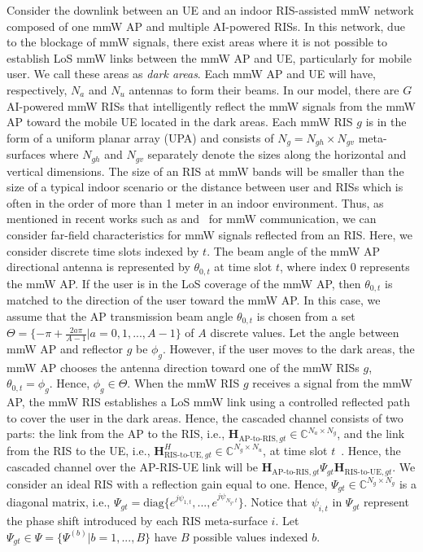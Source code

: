 \documentclass[conference]{IEEEtran}
\begin{document}
Consider the downlink between an UE and an indoor RIS-assisted mmW network composed of one mmW AP and multiple AI-powered RISs. In this network,  due to the blockage of mmW signals, there exist areas where it is not possible to establish LoS mmW links between the mmW AP and UE, particularly for mobile user. We call these areas as \emph{dark areas}. Each mmW AP and UE will have, respectively, $N_a$ and $N_u$ antennas to form their beams. In our model, there are $G$ AI-powered mmW RISs that intelligently reflect the mmW signals from the mmW AP toward the mobile UE located in the dark areas. Each mmW RIS $g$ is in the form of a uniform planar array (UPA) and consists of $N_g=N_{gh}\times N_{gv}$ meta-surfaces where $N_{gh}$ and $N_{gv}$ separately denote the sizes along the horizontal and vertical dimensions. The size of an RIS at mmW bands will be smaller than the size of a typical indoor scenario or the distance between user and RISs which is often in the order of more than 1 meter in an indoor environment. Thus, as mentioned in recent works such as\cite{Abari2018,Kamoda2011} and~\cite{Tan2018} for mmW communication, we can consider far-field characteristics for mmW signals reflected from an RIS. Here, we consider discrete time slots indexed by $t$. The beam angle of the mmW AP directional antenna is represented by $\theta_{0,t}$ at time slot $t$, where index $0$ represents the mmW AP. If the user is in the LoS coverage of the mmW AP, then $\theta_{0,t}$ is matched to the direction of the user toward the mmW AP. In this case, we assume that the AP transmission beam angle $\theta_{0,t}$ is chosen from a set $\Theta=\{-\pi+\frac{2a\pi}{A-1}|a=0,1,...,A-1\}$ of $A$ discrete values. Let the angle between mmW AP and reflector $g$ be $\phi_g$. However, if the user moves to the dark areas, the mmW AP chooses the antenna direction toward one of the mmW RISs $g$, $\theta_{0,t}=\phi_g$. Hence, $\phi_g \in \Theta$. When the mmW RIS $g$ receives a signal from the mmW AP, the mmW RIS establishes a LoS mmW link using a controlled reflected path to cover the user in the dark areas. Hence, the cascaded channel consists of two parts: the link from the AP to the RIS, i.e., $\boldsymbol{H}_{\text{AP-to-RIS},gt} \in \mathbb{C}^{N_a \times N_g}$, and the link from the RIS to the UE, i.e., $\boldsymbol{H}_{\text{RIS-to-UE},gt}^H \in \mathbb{C}^{N_g \times N_u}$, at time slot $t$~\cite{two}. Hence, the cascaded channel over the AP-RIS-UE link will be $\boldsymbol{H}_{\text{AP-to-RIS},gt} \Psi_{gt} \boldsymbol{H}_{\text{RIS-to-UE},gt}$. We consider an ideal RIS with a reflection gain equal to one. Hence, $\Psi_{gt} \in \mathbb{C}^{N_g \times N_g}$ is a diagonal matrix, i.e., $\Psi_{gt}=\text{diag}\{e^{j\psi_{1,t}},...,e^{j\psi_{N_g,t}}\}$. Notice that $\psi_{i,t}$ in $\Psi_{gt}$ represent the phase shift introduced by each RIS meta-surface $i$. Let $\Psi_{gt} \in \Psi=\{ \Psi^{(b)} |b=1,...,B\}$ have $B$ possible values indexed $b$.
\end{document}
